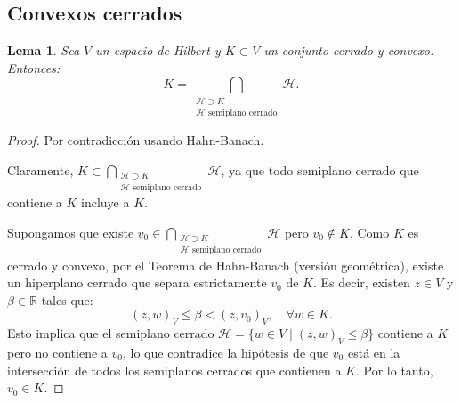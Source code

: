 \documentclass[12pt]{book}
\newtheorem{lemma}{Lema}
\theoremstyle{definition}
\theoremstyle{plain}
\theoremstyle{remark}
\begin{document}


\subsection{Convexos cerrados}

\begin{lemma}
    Sea \(V\) un espacio de Hilbert y \(K \subset V\) un conjunto cerrado y convexo. Entonces:
    \[
    K = \bigcap_{\substack{\mathcal{H} \supset K \\ \mathcal{H} \text{ semiplano cerrado}}} \mathcal{H}.
    \]
\end{lemma}

\begin{proof}
Por contradicción usando Hahn-Banach.

\medskip

\noindent %
Claramente, \(K \subset \bigcap_{\substack{\mathcal{H} \supset K \\ \mathcal{H} \text{ semiplano cerrado}}} \mathcal{H}\), ya que todo semiplano cerrado que contiene a \(K\) incluye a \(K\).

\medskip

Supongamos que existe \(v_0 \in \bigcap_{\substack{\mathcal{H} \supset K \\ \mathcal{H} \text{ semiplano cerrado}}} \mathcal{H}\) pero \(v_0 \notin K\). Como \(K\) es cerrado y convexo, por el Teorema de Hahn-Banach (versión geométrica), existe un hiperplano cerrado que separa estrictamente \(v_0\) de \(K\). Es decir, existen \(z \in V\) y \(\beta \in \mathbb{R}\) tales que:
  \[
  ( z, w )_V  \leq \beta < ( z , v_0 )_V, \quad \forall w \in K.
  \]
  Esto implica que el semiplano cerrado \(\mathcal{H} = \{ w \in V \mid ( z , w )_V \leq \beta \}\) contiene a \(K\) pero no contiene a \(v_0\), lo que contradice la hipótesis de que \(v_0\) está en la intersección de todos los semiplanos cerrados que contienen a \(K\). Por lo tanto, \(v_0 \in K\).
\end{proof}
\end{document}
